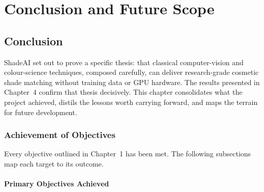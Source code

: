 \chapter{Conclusion and Future Scope}

\section{Conclusion}

ShadeAI set out to prove a specific thesis: that classical computer-vision and colour-science techniques, composed carefully, can deliver research-grade cosmetic shade matching without training data or GPU hardware. The results presented in Chapter~4 confirm that thesis decisively. This chapter consolidates what the project achieved, distils the lessons worth carrying forward, and maps the terrain for future development.

\subsection{Achievement of Objectives}

Every objective outlined in Chapter~1 has been met. The following subsections map each target to its outcome.

\subsubsection{Primary Objectives Achieved}

